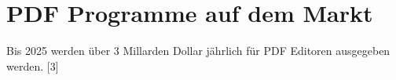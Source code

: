 \chapter{PDF Programme auf dem Markt}
Bis 2025 werden über 3 Millarden Dollar jährlich für PDF Editoren ausgegeben werden. [3]






